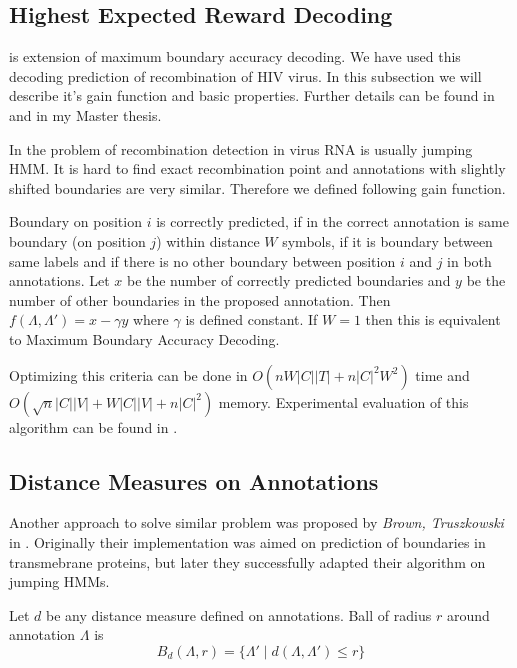 \subsection{Highest Expected Reward Decoding}

 is extension of maximum
boundary accuracy decoding. We have used this decoding prediction of
recombination of HIV virus. In this subsection we will describe it's gain
function and basic properties. Further details can be found in \cite{} and in my
Master thesis\cite{}.


In the problem of recombination detection in virus RNA is usually jumping
HMM\cite{}. It is hard to find exact recombination point and annotations with
slightly shifted boundaries are very similar. Therefore we defined following
gain function.

Boundary on position $i$ is correctly predicted, if in the correct annotation is
same boundary (on position $j$) within distance $W$ symbols, if it is boundary
between same labels and if there is no other boundary between position $i$ and
$j$ in both annotations. Let $x$ be the number of correctly predicted boundaries
and $y$ be the number of other boundaries in the proposed annotation. Then
$f(\Lambda,\Lambda')=x-\gamma y$ where $\gamma$ is defined constant. If $W=1$
then this is equivalent to Maximum Boundary Accuracy Decoding.

Optimizing this criteria can be done in $O(nW|C||T| + n|C|^2W^2)$ time  and
$O(\sqrt{n}|C||V|+W|C||V|+n|C|^2)$ memory. Experimental evaluation of this
algorithm can be found in \cite{}.

\subsection{Distance Measures on Annotations}

Another approach to solve similar problem was proposed by {\it Brown,
Truszkowski} in \cite{}. Originally their implementation was aimed on prediction
of boundaries in transmebrane proteins\cite{}, but later they successfully
adapted their algorithm on jumping HMMs\cite{}.

\begin{definition}
Let $d$ be any distance measure defined on annotations. Ball of radius $r$
around annotation $\Lambda$ is 
\begin{equation}
B_d(\Lambda,r) = \{\Lambda'\mid d(\Lambda,\Lambda')\leq r\}
\end{equation}
\end{definition}

